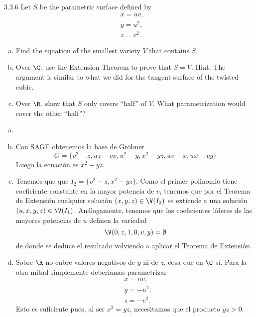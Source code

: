 \documentclass[twoside]{article}
\begin{document}
\begin{ejercicio}{3.3.6}
Let $S$ be the parametric surface defined by
\begin{align*}
&x = uv,\\
&y = u^2,\\
&z = v^2.
\end{align*}
\begin{enumerate}[a.]
\item Find the equation of the smallest variety $V$ that contains $S$.
\item Over $\C$, use the Extension Theorem to prove that $S = V$. Hint: The argument is
similar to what we did for the tangent surface of the twisted cubic.
\item Over $\R$, show that $S$ only covers “half” of $V$. What parametrization would cover the
other “half”?
\end{enumerate}
\end{ejercicio}
\begin{solucion}
\begin{enumerate}[a.]
\item[]
\item Con SAGE obtenemos la base de Gröbner
$$
G=\{v^2 - z, uz - vx, u^2 - y, x^2 - yz, uv - x, ux - vy\}
$$
Luego la ecuación es $x^2-yz$.
\item Tenemos que que $I_2 = \{v^2-z,x^2-yz\}$. Como el primer polinomio tiene coeficiente constante en la mayor potencia de $v$, tenemos que por el Teorema de Extensión cualquier solución $(x,y,z)\in \V(I_2)$ se extiende a una solución $(u,x,y,z)\in \V(I_1)$. Análogamente, tenemos que los coeficientes líderes de las mayores potencias de $u$ definen la variedad
$$
\V(0,z,1,0,v,y) = \emptyset
$$
de donde se deduce el resultado volviendo a aplicar el Teorema de Extensión.
\item Sobre $\R$ no cubre valores negativos de $y$ ni de $z$, cosa que en $\C$ sí. Para la otra mitad simplemente deberíamos parametrizar
\begin{align*}
&x = uv,\\
&y = -u^2,\\
&z = -v^2.
\end{align*}
Esto es suficiente pues, al ser $x^2=yz$, necesitamos que el producto $yz>0$. 
\end{enumerate}
\end{solucion}
\newpage
\end{document}
